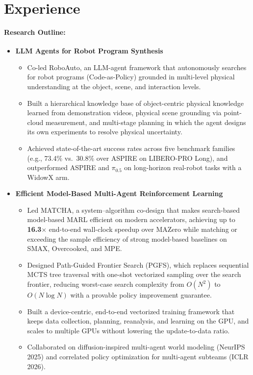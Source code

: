 \documentclass{resume}
\begin{document}
\section{Experience}


\paragraph{Research Outline:}

\begin{itemize}
  \item \textbf{LLM Agents for Robot Program Synthesis}

  \begin{itemize}
    \item Co-led RoboAuto, an LLM-agent framework that autonomously searches for robot programs (Code-as-Policy) grounded in multi-level physical understanding at the object, scene, and interaction levels.
    \item Built a hierarchical knowledge base of object-centric physical knowledge learned from demonstration videos, physical scene grounding via point-cloud measurement, and multi-stage planning in which the agent designs its own experiments to resolve physical uncertainty.
    \item Achieved state-of-the-art success rates across five benchmark families (e.g., 73.4\% vs.\ 30.8\% over ASPIRE on LIBERO-PRO Long), and outperformed ASPIRE and $\pi_{0.5}$ on long-horizon real-robot tasks with a WidowX arm.
  \end{itemize}

  \item \textbf{Efficient Model-Based Multi-Agent Reinforcement Learning}

  \begin{itemize}
    \item Led MATCHA, a system--algorithm co-design that makes search-based model-based MARL efficient on modern accelerators, achieving up to \textbf{16.3$\times$} end-to-end wall-clock speedup over MAZero while matching or exceeding the sample efficiency of strong model-based baselines on SMAX, Overcooked, and MPE.
    \item Designed Path-Guided Frontier Search (PGFS), which replaces sequential MCTS tree traversal with one-shot vectorized sampling over the search frontier, reducing worst-case search complexity from $O(N^2)$ to $O(N \log N)$ with a provable policy improvement guarantee.
    \item Built a device-centric, end-to-end vectorized training framework that keeps data collection, planning, reanalysis, and learning on the GPU, and scales to multiple GPUs without lowering the update-to-data ratio.
    \item Collaborated on diffusion-inspired multi-agent world modeling (NeurIPS 2025) and correlated policy optimization for multi-agent subteams (ICLR 2026).
  \end{itemize}
\end{itemize}
\end{document}
